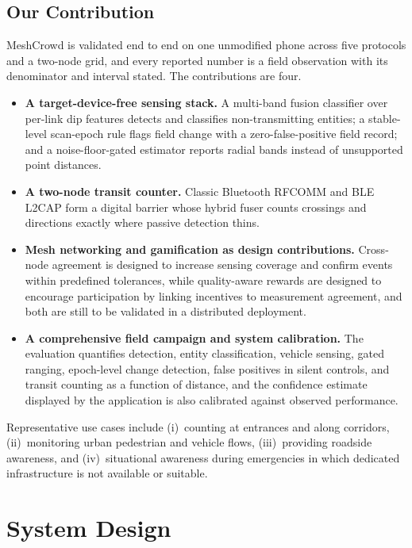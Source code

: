 \documentclass[conference,10pt]{IEEEtran}
\begin{document}
\subsection{Our Contribution}
MeshCrowd is validated end to end on one unmodified phone across five
protocols and a two-node grid, and every reported number is a field
observation with its denominator and interval stated. The contributions are
four.
\begin{itemize}
\item \textbf{A target-device-free sensing stack.} A multi-band fusion
classifier over per-link dip features detects and classifies non-transmitting
entities; a stable-level scan-epoch rule flags field change with a
zero-false-positive field record; and a noise-floor-gated estimator reports
radial bands instead of unsupported point distances.
\item \textbf{A two-node transit counter.} Classic Bluetooth RFCOMM and BLE
L2CAP form a digital barrier whose hybrid fuser counts crossings and
directions exactly where passive detection thins.
\item \textbf{Mesh networking and gamification as design contributions.} Cross-node agreement is designed to increase sensing coverage and confirm events within predefined tolerances, while quality-aware rewards are designed to encourage participation by linking incentives to measurement agreement, and both are still to be validated in a distributed deployment.

\item \textbf{A comprehensive field campaign and system calibration.} The evaluation quantifies detection, entity classification, vehicle sensing, gated ranging, epoch-level change detection, false positives in silent controls, and transit counting as a function of distance, and the confidence estimate displayed by the application is also calibrated against observed performance.

\end{itemize}

Representative use cases include (i)~counting at entrances and along corridors, (ii)~monitoring urban pedestrian and vehicle flows, (iii)~providing roadside awareness, and (iv)~situational awareness during emergencies in which dedicated infrastructure is not available or suitable.

\section{System Design}
\end{document}
